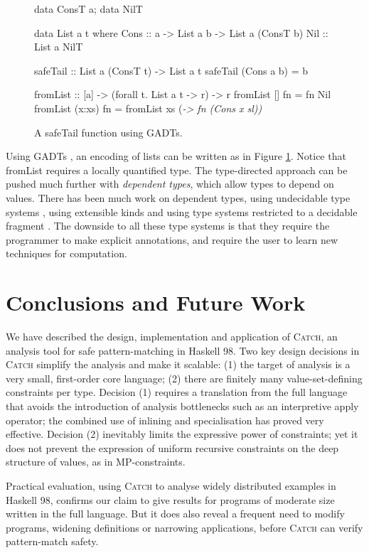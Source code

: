 \documentclass[preprint]{sigplanconf}
\newcommand{\C}[1]{\textsf{#1}}
\newcommand{\catch}{\textsc{Catch}}
\begin{document}
\begin{figure}
\begin{code}
data ConsT a; data NilT

data List a t where
    Cons  :: a -> List a b -> List a (ConsT b)
    Nil   :: List a NilT

safeTail :: List a (ConsT t) -> List a t
safeTail (Cons a b) = b

fromList :: [a] -> (forall t. List a t -> r) -> r
fromList []      fn = fn Nil
fromList (x:xs)  fn = fromList xs (\sl -> fn (Cons x sl))
\end{code}
\caption{A \C{safeTail} function using GADTs.}
\label{fig:gadt}
\end{figure}

Using GADTs \citep{spj:gadt}, an encoding of lists can be written as in Figure \ref{fig:gadt}. Notice that \C{fromList} requires a locally quantified type. The type-directed approach can be pushed much further with \textit{dependent types}, which allow types to depend on values. There has been much work on dependent types, using undecidable type systems \citep{epigram}, using extensible kinds \citep{omega} and using type systems restricted to a decidable fragment \citep{xi:dependent_practical}. The downside to all these type systems is that they require the programmer to make explicit annotations, and require the user to learn new techniques for computation.


\section{Conclusions and Future Work}
\label{sec:conclusion}

We have described the design, implementation and application of \catch{},
an analysis tool for safe pattern-matching in Haskell 98.  Two key
design decisions in \catch{} simplify the analysis and make it scalable:
(1) the target of analysis is a very small, first-order core language;
(2) there are finitely many value-set-defining constraints per type.
Decision (1) requires a translation from the full language that avoids
the introduction of analysis bottlenecks such as an interpretive \C{apply}
operator; the combined use of inlining and specialisation has proved
very effective.  Decision (2) inevitably limits the expressive power of
constraints; yet it does not prevent the expression of uniform recursive
constraints on the deep structure of values, as in MP-constraints.

Practical evaluation, using \catch{} to analyse widely distributed examples
in Haskell 98, confirms our claim to give results for programs of moderate
size written in the full language. But it does also reveal a frequent need
to modify programs, widening definitions or narrowing applications,
before \catch{} can verify pattern-match safety.
\end{document}

